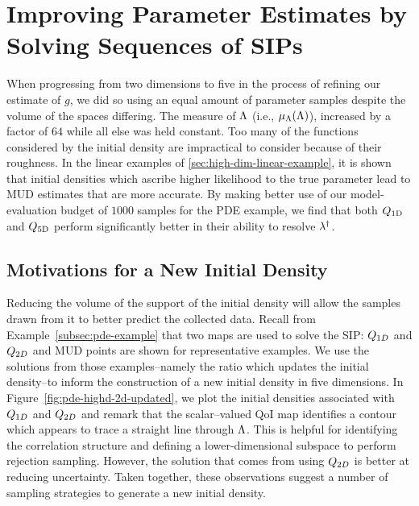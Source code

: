 \section{Improving Parameter Estimates by Solving Sequences of SIPs}\label{sec:mud-pde-sequence}
When progressing from two dimensions to five in the process of refining our estimate of $g$, we did so using an equal amount of parameter samples despite the volume of the spaces differing.
The measure of ${\Lambda}$ (i.e., $\mu_{{\Lambda}}({\Lambda})$), increased by a factor of $64$ while all else was held constant.
Too many of the functions considered by the initial density are impractical to consider because of their roughness.
In the linear examples of \ref{sec:high-dim-linear-example}, it is shown that initial densities which ascribe higher likelihood to the true parameter lead to MUD estimates that are more accurate.
By making better use of our model-evaluation budget of $1000$ samples for the PDE example, we find that both $Q_\text{1D}$ and $Q_\text{5D}$ perform significantly better in their ability to resolve $\lambda^\dagger$.


\subsection{Motivations for a New Initial Density}
Reducing the volume of the support of the initial density will allow the samples drawn from it to better predict the collected data.
Recall from Example~\ref{subsec:pde-example} that two maps are used to solve the SIP: $Q_{1D}$ and $Q_{2D}$ and MUD points are shown for representative examples.
We use the solutions from those examples\---namely the ratio which updates the initial density\---to inform the construction of a new initial density in five dimensions.
In Figure~\ref{fig:pde-highd-2d-updated}, we plot the initial densities associated with $Q_{1D}$ and $Q_{2D}$ and remark that the scalar--valued QoI map identifies a contour which appears to trace a straight line through ${\Lambda}$.
This is helpful for identifying the correlation structure and defining a lower-dimensional subspace to perform rejection sampling. However, the solution that comes from using $Q_{2D}$ is better at reducing uncertainty.
Taken together, these observations suggest a number of sampling strategies to generate a new initial density.

